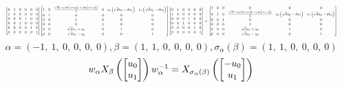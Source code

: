 \documentclass[11pt]{article}
\theoremstyle{definition}
\begin{document}
\[
\scaletoalign{\textwidth}{{\left[\begin{matrix}0 & 1 & 0 & 0 & 0 & 0\\1 & 0 & 0 & 0 & 0 & 0\\0 & 0 & 0 & 1 & 0 & 0\\0 & 0 & 1 & 0 & 0 & 0\\0 & 0 & 0 & 0 & 1 & 0\\0 & 0 & 0 & 0 & 0 & 1\end{matrix}\right]} {\left[\begin{matrix}1 & 0 & \frac{\sqrt{d} \left(- c_{0} d u_{1}^{2} + c_{0} u_{0}^{2} - c_{1} d u_{3}^{2} + c_{1} u_{2}^{2}\right)}{2} & 0 & c_{0} \left(\sqrt{d} u_{0} - d u_{1}\right) & c_{1} \left(\sqrt{d} u_{2} - d u_{3}\right)\\0 & 1 & 0 & 0 & 0 & 0\\0 & 0 & 1 & 0 & 0 & 0\\0 & 0 & 0 & 1 & 0 & 0\\0 & 0 & \sqrt{d} u_{1} + u_{0} & 0 & 1 & 0\\0 & 0 & \sqrt{d} u_{3} + u_{2} & 0 & 0 & 1\end{matrix}\right]} {\left[\begin{matrix}0 & 1 & 0 & 0 & 0 & 0\\1 & 0 & 0 & 0 & 0 & 0\\0 & 0 & 0 & 1 & 0 & 0\\0 & 0 & 1 & 0 & 0 & 0\\0 & 0 & 0 & 0 & 1 & 0\\0 & 0 & 0 & 0 & 0 & 1\end{matrix}\right]} = {\left[\begin{matrix}1 & 0 & 0 & 0 & 0 & 0\\0 & 1 & 0 & \frac{\sqrt{d} \left(- c_{0} d u_{1}^{2} + c_{0} u_{0}^{2} - c_{1} d u_{3}^{2} + c_{1} u_{2}^{2}\right)}{2} & c_{0} \left(\sqrt{d} u_{0} - d u_{1}\right) & c_{1} \left(\sqrt{d} u_{2} - d u_{3}\right)\\0 & 0 & 1 & 0 & 0 & 0\\0 & 0 & 0 & 1 & 0 & 0\\0 & 0 & 0 & \sqrt{d} u_{1} + u_{0} & 1 & 0\\0 & 0 & 0 & \sqrt{d} u_{3} + u_{2} & 0 & 1\end{matrix}\right]}}
\]
\[
\alpha = \left( -1, \  1, \  0, \  0, \  0, \  0\right), \beta = \left( 1, \  1, \  0, \  0, \  0, \  0\right), \sigma_{\alpha}(\beta) = \left( 1, \  1, \  0, \  0, \  0, \  0\right)
\]
\[
\scaletoalign{\textwidth}{w_{\alpha} X_{\beta}\left(\left[\begin{matrix}u_{0}\\u_{1}\end{matrix}\right]\right) w_{\alpha}^{-1} = X_{\sigma_{\alpha}\left(\beta\right)}\left(\left[\begin{matrix}- u_{0}\\u_{1}\end{matrix}\right]\right)}
\]
\end{document}

